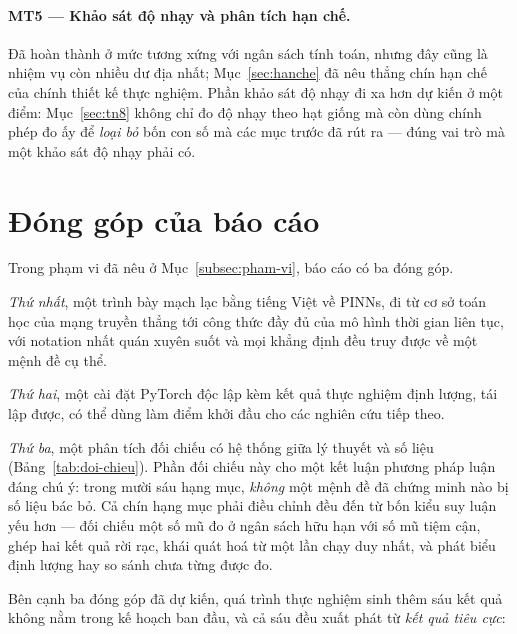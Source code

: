 \paragraph{MT5 --- Khảo sát độ nhạy và phân tích hạn chế.}
Đã hoàn thành ở mức tương xứng với ngân sách tính toán, nhưng đây cũng là nhiệm
vụ còn nhiều dư địa nhất; Mục~\ref{sec:hanche} đã nêu thẳng chín hạn chế của chính
thiết kế thực nghiệm. Phần khảo sát độ nhạy đi xa hơn dự kiến ở một điểm:
Mục~\ref{sec:tn8} không chỉ đo độ nhạy theo hạt giống mà còn dùng chính phép đo
ấy để \emph{loại bỏ} bốn con số mà các mục trước đã rút ra --- đúng vai trò mà
một khảo sát độ nhạy phải có.

\section{Đóng góp của báo cáo}
\label{sec:dong-gop-cuoi}

Trong phạm vi đã nêu ở Mục~\ref{subsec:pham-vi}, báo cáo có ba đóng góp.

\emph{Thứ nhất}, một trình bày mạch lạc bằng tiếng Việt về PINNs, đi từ cơ sở
toán học của mạng truyền thẳng tới công thức đầy đủ của mô hình thời gian liên
tục, với notation nhất quán xuyên suốt và mọi khẳng định đều truy được về một
mệnh đề cụ thể.

\emph{Thứ hai}, một cài đặt PyTorch độc lập kèm kết quả thực nghiệm định lượng,
tái lập được, có thể dùng làm điểm khởi đầu cho các nghiên cứu tiếp theo.

\emph{Thứ ba}, một phân tích đối chiếu có hệ thống giữa lý thuyết và số liệu
(Bảng~\ref{tab:doi-chieu}). Phần đối chiếu này cho một kết luận phương pháp luận
đáng chú ý: trong mười sáu hạng mục, \emph{không} một mệnh đề đã chứng minh nào
bị số liệu bác bỏ. Cả chín hạng mục phải điều chỉnh đều đến từ bốn kiểu suy luận
yếu hơn --- đối chiếu một số mũ đo ở ngân sách hữu hạn với số mũ tiệm cận, ghép
hai kết quả rời rạc, khái quát hoá từ một lần chạy duy nhất, và phát biểu định
lượng hay so sánh chưa từng được đo.

Bên cạnh ba đóng góp đã dự kiến, quá trình thực nghiệm sinh thêm sáu kết quả
không nằm trong kế hoạch ban đầu, và cả sáu đều xuất phát từ \emph{kết quả tiêu
cực}:

